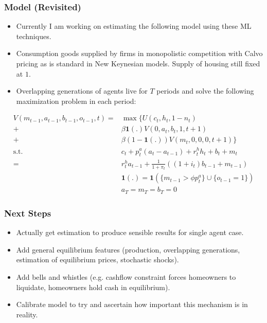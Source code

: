 \documentclass{beamer}
\begin{document}
\begin{frame}
    \frametitle{Model (Revisited)}
    \begin{itemize}
        \item Currently I am working on estimating the following model using these ML techniques.
        \item Consumption goods supplied by firms in monopolistic competition with Calvo pricing \parencite{calvo1983staggered} as is standard in New Keynesian models. Supply of housing still fixed at $1$.
        \item Overlapping generations of agents live for $T$ periods and solve the following maximization problem in each period:
    \end{itemize}
    \begin{align}
        V(m_{t-1}, a_{t-1}, b_{t-1}, o_{t-1}, t) =& \max \{ U(c_t, h_t, 1-n_t) \nonumber \\
        +& \beta \mathbf{1}(.) V(0, a_t, b_t, 1, t+1) \nonumber \\
        +& \beta (1 - \mathbf{1}(.)) V(m_t, 0, 0, 0, t+1) \} \\
        \text{s.t. }& c_t + p^a_t (a_t - a_{t-1}) + r^h_t h_t + b_t + m_t \nonumber \\
        =& r^h_ta_{t-1} + \frac{1}{1+\pi_t}((1+i_t) b_{t-1} + m_{t-1}) \\
        &\mathbf{1}(.) = \mathbf{1}(\{m_{t-1} > \phi p^a_t\} \cup \{o_{t-1} = 1\}) \\
        & a_T = m_T = b_T = 0
    \end{align}
\end{frame}

\begin{frame}
    \frametitle{Next Steps}
    \begin{itemize}
        \item Actually get estimation to produce sensible results for single agent case.
        \item Add general equilibrium features (production, overlapping generations, estimation of equilibrium prices, stochastic shocks).
        \item Add bells and whistles (e.g. cashflow constraint forces homeowners to liquidate, homeowners hold cash in equilibrium).
        \item Calibrate model to try and ascertain how important this mechanism is in reality.
    \end{itemize}
\end{frame}

\begin{frame}
\end{frame}

\begin{frame}
    \printbibliography
\end{frame}
\end{document}
